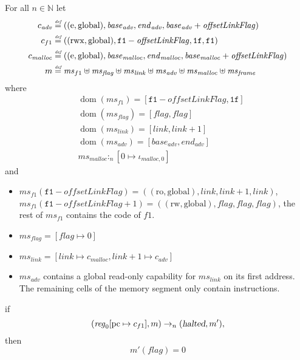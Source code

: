 \documentclass[a4paper]{article}
\newcommand{\forcenewline}{$\phantom{v}$\\}
\newcommand{\update}[2]{[#1 \mapsto #2]}
\newcommand{\defeq}{\stackrel{\textit{\tiny{def}}}{=}}
\DeclareMathOperator{\dom}{dom}
\newcommand{\var}[1]{\mathit{#1}}
\newcommand{\hs}{\var{ms}}
\newcommand{\ms}{\hs}
\newcommand{\pcreg}{\mathrm{pc}}
\newcommand{\start}{\var{base}}
\newcommand{\addrend}{\var{end}}
\newcommand{\reg}{\var{reg}}
\newcommand{\heap}{\var{mem}}
\newcommand{\adv}{\var{adv}}
\newcommand{\link}{\var{link}}
\newcommand{\flag}{\var{flag}}
\newcommand{\olf}{\var{offsetLinkFlag}}
\newcommand{\halted}{\textsl{halted}}
\newcommand{\heapSat}[3][\heap]{#1 :_{#2} #3}
\newcommand{\codelabel}[1]{\mathit{#1}}
\newcommand{\malloc}{\codelabel{malloc}}
\newcommand{\nats}{\mathbb{N}}
\newcommand{\plainperm}[1]{\mathrm{#1}}
\newcommand{\readonly}{\plainperm{ro}}
\newcommand{\readwrite}{\plainperm{rw}}
\newcommand{\entry}{\plainperm{e}}
\newcommand{\rwx}{\plainperm{rwx}}
\newcommand{\glob}{\plainperm{global}}
\newcommand{\step}[1][]{\rightarrow_{#1}}
\begin{document}
              \begin{lemma} \forcenewline
                \label{lem:correctness-f1}
                For all $n \in \nats$
                let
                \begin{align*}
                  c_{\var{adv}} & \defeq ((\entry,\glob),\start_{\adv},\addrend_{\adv},\start_{\adv}+\olf) \\
                  c_{f1} & \defeq ((\rwx,\glob),\mathtt{f1}-\olf,\mathtt{1f},\mathtt{f1}) \\
                  c_\malloc & \defeq ((\entry,\glob),\start_\malloc,\addrend_\malloc,\start_\malloc+\olf) \\
                  m & \defeq \hs_{f1} \uplus 
                      \hs_\flag \uplus                
                      \ms_{\var{link}} \uplus 
                      \hs_\adv \uplus 
                      \ms_{\malloc} \uplus 
                      \hs_{\var{frame}} 
                \end{align*}
                where 
                \begin{align*}
                  &\dom(\hs_{f1}) = [\mathtt{f1}-\olf,\mathtt{1f}] \\
                  &\dom(\hs_\flag) = [\flag,\flag] \\
                  &\dom(\ms_\link) = [\link,\link+1]\\
                  &\dom(\hs_{\adv}) = [\start_\adv,\addrend_\adv] \\
                  &\heapSat[\hs_{\malloc}]{n}{[0 \mapsto \iota_{\malloc,0}]}
                \end{align*}
                and
                \begin{itemize}
                \item $\ms_{f1}(\mathtt{f1}-\olf) = ((\readonly,\glob),\link,\link+1,\link)$, $\ms_{f1}(\mathtt{f1}-\olf+1) = ((\readwrite,\glob),\flag,\flag,\flag)$, the rest of $\hs_{f1}$ contains the code of $f1$.
                \item $\ms_\flag = [\flag \mapsto 0]$
                \item $\ms_{\var{link}} = [\var{link} \mapsto c_\malloc, \var{link} + 1 \mapsto c_\adv]$
                \item $\hs_\adv$ contains a global read-only capability for $\hs_\link$ on its first address. The remaining cells of the memory segment only contain instructions.
                \end{itemize}
                if 
                \[
                  (\reg_0\update{\pcreg}{c_{f1}},m) \step[n] (\halted,m'),
                \]
                then
                \[
                  m'(\flag) = 0
                \]  
              \end{lemma}
\end{document}
